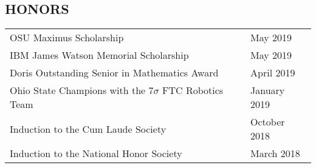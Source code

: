 \documentclass[line, margin]{res}
\begin{document}
\begin{resume}
  \section{HONORS}
  \begin{tabular}{p{\dimexpr \textwidth-4cm \relax}>{\raggedleft\arraybackslash}p{3cm}}
    OSU Maximus Scholarship &                                          May 2019 \\
    IBM James Watson Memorial Scholarship &                            May 2019 \\
    Doris Outstanding Senior in Mathematics Award &                    April 2019 \\
    Ohio State Champions with the 7$\sigma$ FTC Robotics Team &        January 2019 \\
    Induction to the Cum Laude Society &                               October 2018 \\
    Induction to the National Honor Society &                          March 2018 \\
  \end{tabular}

\end{resume}
\end{document}
